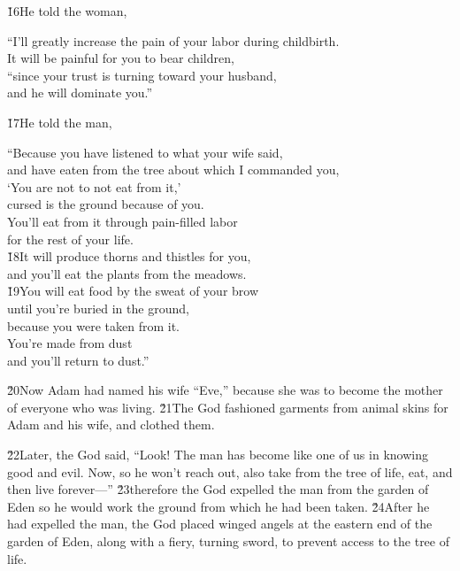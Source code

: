 \v{16}He told the woman,

\begin{poetry}
\poeml ``I'll greatly increase the pain of your labor during childbirth. \\
\poemll    It will be painful for you to bear children, \\
\poeml ``since your trust is turning toward your husband, \\
\poemll    and he will dominate you.''
\end{poetry}

\v{17}He told the man,

\begin{poetry}
\poeml ``Because you have listened to what your wife said, \\
\poemll    and have eaten from the tree about which I commanded you, \\
\poemlll       `You are not to not eat from it,' \\
\poeml cursed is the ground because of you. \\
\poemll    You'll eat from it through pain-filled labor \\
\poemlll       for the rest of your life. \\
\poeml \v{18}It will produce thorns and thistles for you, \\
\poemll    and you'll eat the plants from the meadows. \\
\poeml \v{19}You will eat food by the sweat of your brow \\
\poemll    until you're buried in the ground, \\
\poemlll       because you were taken from it. \\
\poeml You're made from dust \\
\poemll    and you'll return to dust.''
\end{poetry}

\v{20}Now Adam had named his wife ``Eve,'' because she was to become the mother of everyone who was living. \v{21}The  God fashioned garments from animal skins for Adam and his wife, and clothed them.

\v{22}Later, the  God said, ``Look! The man has become like one of us in knowing good and evil. Now, so he won't reach out, also take from the tree of life, eat, and then live forever---'' \v{23}therefore the  God expelled the man from the garden of Eden so he would work the ground from which he had been taken. \v{24}After he had expelled the man, the  God placed winged angels at the eastern end of the garden of Eden, along with a fiery, turning sword, to prevent access to the tree of life.

